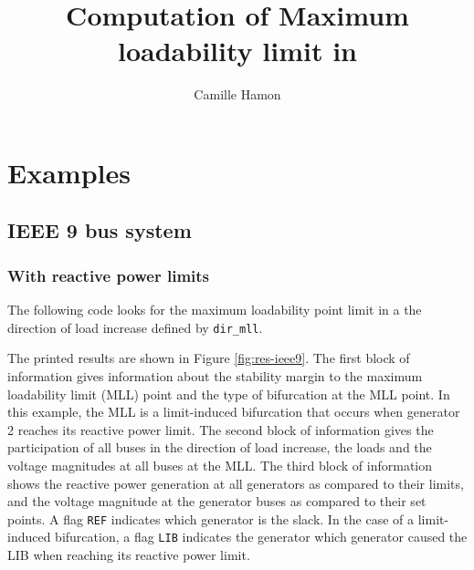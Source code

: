 \documentclass[12pt,a4]{article}
\title{Computation of Maximum loadability limit in \matpower}
\author{Camille Hamon}
\newcommand*{\codemat}[1]{\texttt{#1}}
\begin{document}
\maketitle

\tableofcontents

\section{Examples}
\label{sec:examples}

\subsection{IEEE 9 bus system}

\subsubsection{With reactive power limits}
\label{sec:with-reactive-power}

The following code looks for the maximum loadability point limit in a the direction of load increase defined by \codemat{dir\_mll}.



The printed results are shown in Figure \ref{fig:res-ieee9}. 
The first block of information gives information about the stability margin to the maximum loadability limit (MLL) point and the type of bifurcation at the MLL point. 
In this example, the MLL is a limit-induced bifurcation that occurs when generator 2 reaches its reactive power limit.
The second block of information gives the participation of all buses in the direction of load increase, the loads and the voltage magnitudes at all buses at the MLL. 
The third block of information shows the reactive power generation at all generators as compared to their limits, and the voltage magnitude at the generator buses as compared to their set points. 
A flag \codemat{REF} indicates which generator is the slack. 
In the case of a limit-induced bifurcation, a flag \codemat{LIB} indicates the generator which generator caused the LIB when reaching its reactive power limit.
\end{document}
